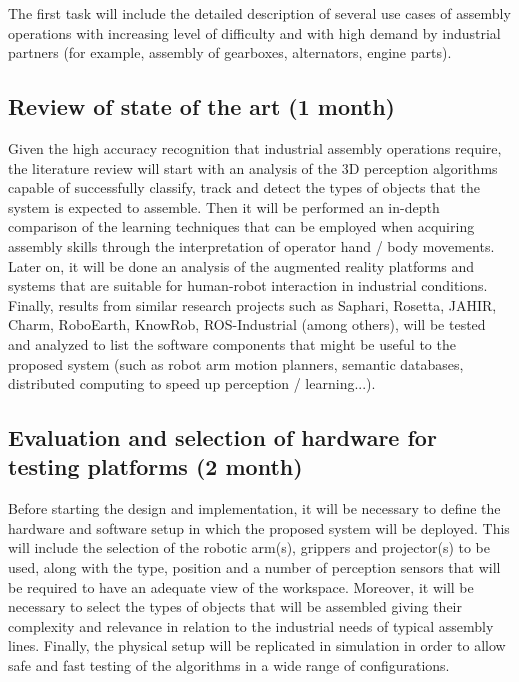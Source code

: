 The first task will include the detailed description of several use cases of assembly operations with increasing level of difficulty and with high demand by industrial partners (for example, assembly of gearboxes, alternators, engine parts).


\subsection{Review of state of the art (1 month)}

Given the high accuracy recognition that industrial assembly operations require, the literature review will start with an analysis of the 3D perception algorithms capable of successfully classify, track and detect the types of objects that the system is expected to assemble. Then it will be performed an in-depth comparison of the learning techniques that can be employed when acquiring assembly skills through the interpretation of operator hand / body movements. Later on, it will be done an analysis of the augmented reality platforms and systems that are suitable for human-robot interaction in industrial conditions.
Finally, results from similar research projects such as Saphari, Rosetta, JAHIR, Charm, RoboEarth, KnowRob, ROS-Industrial (among others), will be tested and analyzed to list the software components that might be useful to the proposed system (such as robot arm motion planners, semantic databases, distributed computing to speed up perception / learning...).


\subsection{Evaluation and selection of hardware for testing platforms (2 month)}

Before starting the design and implementation, it will be necessary to define the hardware and software setup in which the proposed system will be deployed. This will include the selection of the robotic arm(s), grippers and projector(s) to be used, along with the type, position and a number of perception sensors that will be required to have an adequate view of the workspace. Moreover, it will be necessary to select the types of objects that will be assembled giving their complexity and relevance in relation to the industrial needs of typical assembly lines.
Finally, the physical setup will be replicated in simulation in order to allow safe and fast testing of the algorithms in a wide range of configurations.


